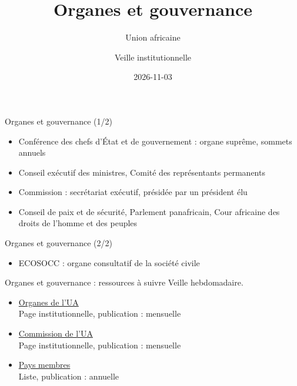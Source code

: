 \documentclass[aspectratio=169,11pt]{beamer}
\title{Organes et gouvernance}
\subtitle{Union africaine}
\author{Veille institutionnelle}
\date{2026-11-03}
\begin{document}
\begin{frame}\titlepage\end{frame}

\begin{frame}{Organes et gouvernance (1/2)}
\begin{itemize}
\item Conférence des chefs d'État et de gouvernement : organe suprême, sommets annuels
\item Conseil exécutif des ministres, Comité des représentants permanents
\item Commission : secrétariat exécutif, présidée par un président élu
\item Conseil de paix et de sécurité, Parlement panafricain, Cour africaine des droits de l'homme et des peuples
\end{itemize}
\end{frame}

\begin{frame}{Organes et gouvernance (2/2)}
\begin{itemize}
\item ECOSOCC : organe consultatif de la société civile
\end{itemize}
\end{frame}

\begin{frame}{Organes et gouvernance : ressources à suivre}
\small
Veille hebdomadaire.
\begin{itemize}
\item \href{https://au.int/en/organs}{Organes de l'UA}\\{\footnotesize Page institutionnelle, publication : mensuelle}
\item \href{https://au.int/en/commission}{Commission de l'UA}\\{\footnotesize Page institutionnelle, publication : mensuelle}
\item \href{https://au.int/en/member_states/countryprofiles2}{Pays membres}\\{\footnotesize Liste, publication : annuelle}
\end{itemize}
\end{frame}
\end{document}
